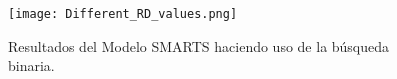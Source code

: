 \begin{frame}
    \begin{figure}[H]
        \renewcommand{\yourowntexcol}{black}
        \centering
        \texttt{[image: Different\_RD\_values.png]}
        \small
        \caption{Resultados del Modelo SMARTS haciendo uso de la búsqueda binaria.}
    \end{figure}
\end{frame}